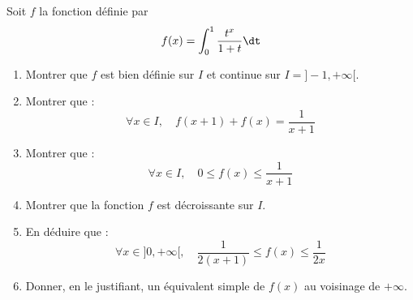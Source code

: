 \documentclass[a4paper,10pt]{report}
\begin{document}
\begin{Exercice}{} Soit $f$ la fonction d\'efinie par 
$$f(x)=\int_0^1 \frac{t^x}{1+t} \dt$$
	\begin{enumerate}
	\item Montrer que $f$ est bien d\'efinie sur $I$ et continue sur $I=]-1, + \infty[$.

	\item Montrer que :
$$\forall x\in I,\quad f(x+1)+f(x)=\frac1{x+1}$$

	\item Montrer que :
$$\forall x\in I,\quad 0\le f(x) \le \frac1{x+1}$$

	\item Montrer que la fonction $f$ est d\'ecroissante sur $I$.

	\item En d\'eduire que :
$$\forall x\in]0,+\infty[,\quad \frac1{2(x+1)} \le f(x) \le \frac1{2x}$$

	\item Donner, en le justifiant, un \'equivalent simple de $f(x)$ au voisinage de $+\infty$.
	\end{enumerate}
\end{Exercice}

\corr 
\end{document}
